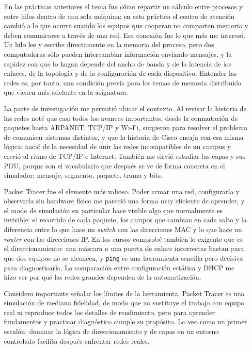 En las prácticas anteriores el tema fue cómo repartir un cálculo entre procesos y entre hilos dentro de una sola máquina; en esta práctica el centro de atención cambió a lo que ocurre cuando los equipos que cooperan no comparten memoria y deben comunicarse a través de una red. Esa conexión fue lo que más me interesó. Un hilo lee y escribe directamente en la memoria del proceso, pero dos computadoras sólo pueden intercambiar información enviando mensajes, y la rapidez con que lo hagan depende del ancho de banda y de la latencia de los enlaces, de la topología y de la configuración de cada dispositivo. Entender las redes es, por tanto, una condición previa para los temas de memoria distribuida que vienen más adelante en la asignatura.

La parte de investigación me permitió ubicar el contexto. Al revisar la historia de las redes noté que casi todos los avances importantes, desde la conmutación de paquetes hasta ARPANET, TCP/IP y Wi-Fi, surgieron para resolver el problema de comunicar sistemas distintos, y que la historia de Cisco encaja con esa misma lógica: nació de la necesidad de unir las redes incompatibles de un campus y creció al ritmo de TCP/IP e Internet. También me sirvió estudiar las capas y sus PDU, porque son el vocabulario que después se ve de forma concreta en el simulador: mensaje, segmento, paquete, trama y bits.

Packet Tracer fue el elemento más valioso. Poder armar una red, configurarla y observarla sin hardware físico me pareció una forma muy eficiente de aprender, y el modo de simulación en particular hace visible algo que normalmente es invisible: el recorrido de cada paquete, los campos que cambian en cada salto y la diferencia entre lo que hace un \emph{switch} con las direcciones MAC y lo que hace un \emph{router} con las direcciones IP. En los cursos comprobé también lo exigente que es el direccionamiento: una máscara o una puerta de enlace incorrectas bastan para que dos equipos no se alcancen, y \texttt{ping} es una herramienta sencilla pero decisiva para diagnosticarlo. La comparación entre configuración estática y DHCP me hizo ver por qué las redes grandes dependen de la automatización.

Considero importante señalar los límites de la herramienta. Packet Tracer es una simulación de mediana fidelidad, de modo que no sustituye el trabajo con equipo real ni reproduce todos los detalles de rendimiento, pero para aprender fundamentos y practicar diagnóstico cumple su propósito. Lo veo como un primer escalón: dominar la lógica de direccionamiento y de capas en un entorno controlado facilita después enfrentar redes reales.

